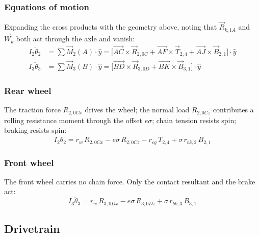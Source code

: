 \documentclass[10pt]{extarticle}
\numberwithin{equation}{subsubsection}
\begin{document}
\subsubsection{Equations of motion}

Expanding the cross products with the geometry above, noting that $\vec{R}_{k,1A}$ and $\vec{W}_k$ both act through the axle and vanish:
\begin{align}
    I_2\ddot{\theta}_2 &= \sum \vec{M}_2(A)\cdot\hat{y}
        = \bigl[\vec{AC}\times\vec{R}_{2,0C} + \vec{AF}\times\vec{T}_{2,4}
          + \vec{AJ}\times\vec{B}_{2,1}\bigr]\cdot\hat{y} \\[6pt]
    I_3\ddot{\theta}_3 &= \sum \vec{M}_3(B)\cdot\hat{y}
        = \bigl[\vec{BD}\times\vec{R}_{3,0D}
          + \vec{BK}\times\vec{B}_{3,1}\bigr]\cdot\hat{y}
\end{align}

\subsubsection{Rear wheel}

The traction force $R_{2,0Cx}$ drives the wheel; the normal load $R_{2,0Cz}$ contributes a rolling resistance moment through the offset $e\sigma$; chain tension resists spin; braking resists spin:
\begin{equation}
    I_2\ddot{\theta}_2 = r_w\,R_{2,0Cx} - e\sigma\,R_{2,0Cz}
        - r_{cg}\,T_{2,4} + \sigma\,r_{bk,2}\,B_{2,1}
\end{equation}

\subsubsection{Front wheel}

The front wheel carries no chain force. Only the contact resultant and the brake act:
\begin{equation}
    I_3\ddot{\theta}_3 = r_w\,R_{3,0Dx} - e\sigma\,R_{3,0Dz}
        + \sigma\,r_{bk,3}\,B_{3,1}
\end{equation}

\newpage
\subsection{Drivetrain}
\end{document}
